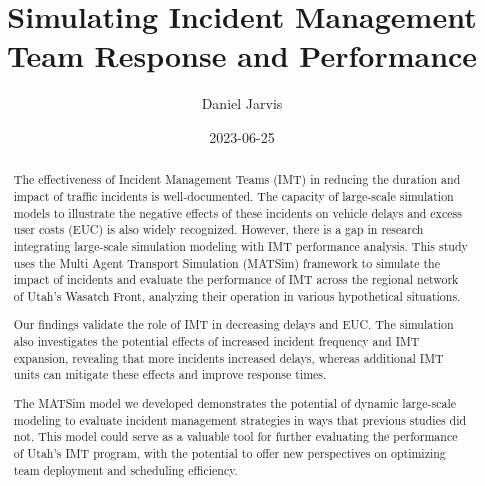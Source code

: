 \documentclass[fancy, oneside, mastersfancy, ms]{byuthesis}
\title{Simulating Incident Management Team Response and Performance}
\author{Daniel Jarvis}
\date{2023-06-25}
\begin{document}
\frontmatter
\titlepage
\cleardoublepage

\customtitlepage
\cleardoublepage


  \begin{abstract}
The effectiveness of Incident Management Teams (IMT) in reducing the
duration and impact of traffic incidents is well-documented. The
capacity of large-scale simulation models to illustrate the negative
effects of these incidents on vehicle delays and excess user costs (EUC)
is also widely recognized. However, there is a gap in research
integrating large-scale simulation modeling with IMT performance
analysis. This study uses the Multi Agent Transport Simulation (MATSim)
framework to simulate the impact of incidents and evaluate the
performance of IMT across the regional network of Utah's Wasatch Front,
analyzing their operation in various hypothetical situations.

Our findings validate the role of IMT in decreasing delays and EUC. The
simulation also investigates the potential effects of increased incident
frequency and IMT expansion, revealing that more incidents increased
delays, whereas additional IMT units can mitigate these effects and
improve response times.

The MATSim model we developed demonstrates the potential of dynamic
large-scale modeling to evaluate incident management strategies in ways
that previous studies did not. This model could serve as a valuable tool
for further evaluating the performance of Utah's IMT program, with the
potential to offer new perspectives on optimizing team deployment and
scheduling efficiency.
\end{abstract}
\cleardoublepage
\end{document}
